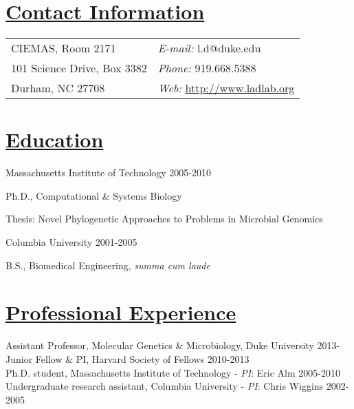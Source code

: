 \documentclass[overlapped,line,11pt]{res}
\newenvironment{list1}{
  \begin{list}{\ding{113}}{%
      \setlength{\itemsep}{0in}
      \setlength{\parsep}{0in} \setlength{\parskip}{0in}
      \setlength{\topsep}{0in} \setlength{\partopsep}{0in} 
      \setlength{\leftmargin}{0.17in}}}{\end{list}}
\begin{document}
\setlength{\pdfpageheight}{\paperheight}
\setlength{\pdfpagewidth}{\paperwidth}


\begin{resume}
\section{\underline{\sc Contact Information}}
\vspace{.05in}
\begin{tabular}{@{}p{4in}p{4in}}

CIEMAS, Room 2171     & {\it E-mail:}    l.d@duke.edu \\                
101 Science Drive, Box 3382   & {\it Phone:} 919.668.5388 \\
Durham, NC 27708 & {\it Web:} \url{http://www.ladlab.org} 

\end{tabular}

\section{\underline{\sc Education}}
\vspace{.05in}
Massachusetts Institute of Technology
\hfill 2005-2010\\

\vspace*{-5mm}
\begin{list1}
\item[] Ph.D., Computational \& Systems Biology
\item[] Thesis: Novel Phylogenetic Approaches to Problems in Microbial Genomics
\end{list1}

\vspace*{-2.5mm}
Columbia University \hfill 2001-2005\\
\vspace*{-5mm}
\begin{list1}
\item[] B.S., Biomedical Engineering, \emph{summa cum laude}
\end{list1}

\section{\underline{\sc Professional Experience}}
\vspace{.05in}
Assistant Professor, Molecular Genetics \& Microbiology, Duke University \hfill 2013-\hspace{7.5mm} \\
Junior Fellow \& PI, Harvard Society of Fellows \hfill 2010-2013\\
Ph.D. student, Massachusetts Institute of Technology - \emph{PI}: Eric Alm \hfill
2005-2010 \\
Undergraduate research assistant, Columbia University - \emph{PI}: Chris Wiggins
\hfill 2002-2005 


\end{resume}
\end{document}
